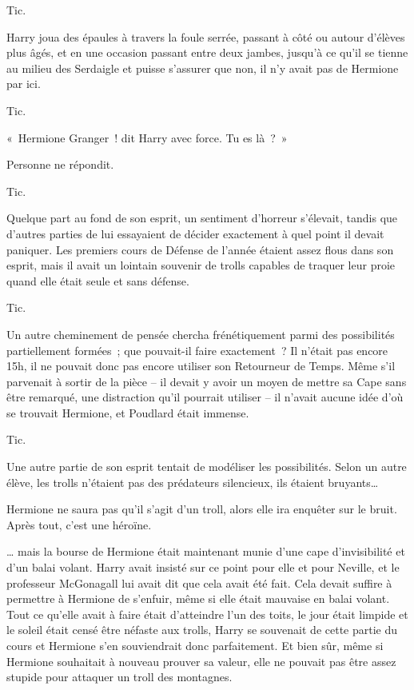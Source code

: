 Tic.

Harry joua des épaules à travers la foule serrée, passant à côté ou autour d'élèves plus âgés, et en une occasion passant entre deux jambes, jusqu'à ce qu'il se tienne au milieu des Serdaigle et puisse s'assurer que non, il n'y avait pas de Hermione par ici.

Tic.

«~Hermione Granger~! dit Harry avec force. Tu es là~?~»

Personne ne répondit.

Tic.

Quelque part au fond de son esprit, un sentiment d'horreur s'élevait, tandis que d'autres parties de lui essayaient de décider exactement à quel point il devait paniquer. Les premiers cours de Défense de l'année étaient assez flous dans son esprit, mais il avait un lointain souvenir de trolls capables de traquer leur proie quand elle était seule et sans défense.

Tic.

Un autre cheminement de pensée chercha frénétiquement parmi des possibilités partiellement formées~; que pouvait-il faire exactement~? Il n'était pas encore 15h, il ne pouvait donc pas encore utiliser son Retourneur de Temps. Même s'il parvenait à sortir de la pièce -- il devait y avoir un moyen de mettre sa Cape sans être remarqué, une distraction qu'il pourrait utiliser -- il n'avait aucune idée d'où se trouvait Hermione, et Poudlard était immense.

Tic.

Une autre partie de son esprit tentait de modéliser les possibilités. Selon un autre élève, les trolls n'étaient pas des prédateurs silencieux, ils étaient bruyants…

Hermione ne saura pas qu'il s'agit d'un troll, alors elle ira enquêter sur le bruit. Après tout, c'est une héroïne.

… mais la bourse de Hermione était maintenant munie d'une cape d'invisibilité et d'un balai volant. Harry avait insisté sur ce point pour elle et pour Neville, et le professeur McGonagall lui avait dit que cela avait été fait. Cela devait suffire à permettre à Hermione de s'enfuir, même si elle était mauvaise en balai volant. Tout ce qu'elle avait à faire était d'atteindre l'un des toits, le jour était limpide et le soleil était censé être néfaste aux trolls, Harry se souvenait de cette partie du cours et Hermione s'en souviendrait donc parfaitement. Et bien sûr, même si Hermione souhaitait à nouveau prouver sa valeur, elle ne pouvait pas être assez stupide pour attaquer un troll des montagnes.

